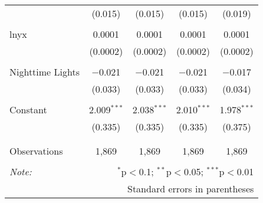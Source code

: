 \begin{table}[!htbp]
\begin{tabular}{@{\extracolsep{5pt}}lcccc}
  & (0.015) & (0.015) & (0.015) & (0.019) \\ 
  & & & & \\ 
 lnyx & 0.0001 & 0.0001 & 0.0001 & 0.0001 \\ 
  & (0.0002) & (0.0002) & (0.0002) & (0.0002) \\ 
  & & & & \\ 
 Nighttime Lights & $-$0.021 & $-$0.021 & $-$0.021 & $-$0.017 \\ 
  & (0.033) & (0.033) & (0.033) & (0.034) \\ 
  & & & & \\ 
 Constant & 2.009$^{***}$ & 2.038$^{***}$ & 2.010$^{***}$ & 1.978$^{***}$ \\ 
  & (0.335) & (0.335) & (0.335) & (0.375) \\ 
  & & & & \\ 
\hline \\[-1.8ex] 
Observations & 1,869 & 1,869 & 1,869 & 1,869 \\ 
\hline 
\hline \\[-1.8ex] 
\textit{Note:}  & \multicolumn{4}{r}{$^{*}$p$<$0.1; $^{**}$p$<$0.05; $^{***}$p$<$0.01} \\ 
 & \multicolumn{4}{r}{Standard errors in parentheses} \\ 
\end{tabular} 
\end{table} 